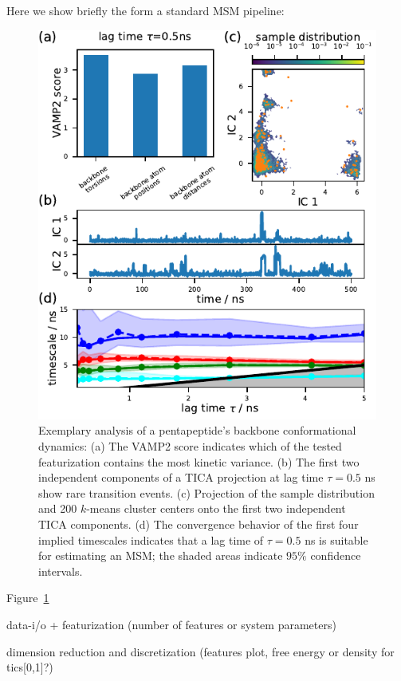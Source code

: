 \documentclass[9pt,tutorial,lineno,onehalfspacing]{livecoms}
\begin{document}
Here we show briefly the form a standard MSM pipeline:

\begin{figure}
\includegraphics{figure_1}
\caption{Exemplary analysis of a pentapeptide's backbone conformational dynamics: (a) The VAMP2 score indicates which of the tested featurization contains the most kinetic variance. (b) The first two independent components of a TICA projection at lag time $\tau=0.5$ ns show rare transition events. (c) Projection of the sample distribution and 200 $k$-means cluster centers onto the first two independent TICA components. (d) The convergence behavior of the first four implied timescales indicates that a lag time of $\tau=0.5$ ns is suitable for estimating an MSM; the shaded areas indicate $95\%$ confidence intervals.}
\label{fig:io-to-its}
\end{figure}

Figure~\ref{fig:io-to-its}




data-i/o + featurization (number of features or system parameters)

dimension reduction and discretization (features plot, free energy or density for tics[0,1]?)
\end{document}
